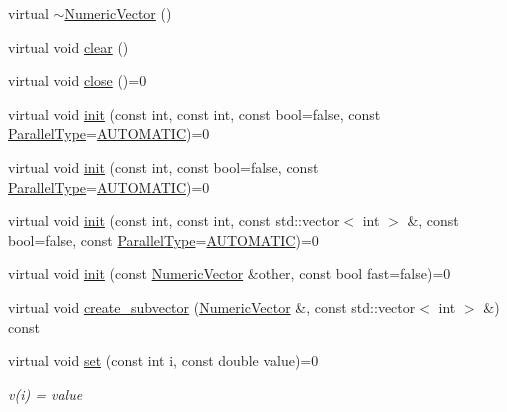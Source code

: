 \begin{DoxyCompactItemize}
\item 
virtual \mbox{\hyperlink{classfemus_1_1_numeric_vector_ae69f03cf2a4e651f87c9bccb4c454220}{$\sim$\+Numeric\+Vector}} ()
\item 
virtual void \mbox{\hyperlink{classfemus_1_1_numeric_vector_ab208467b03b999ece4888d64a7cc7ece}{clear}} ()
\item 
virtual void \mbox{\hyperlink{classfemus_1_1_numeric_vector_a80eb1dc1f53018fd7d08bcc4a511cc09}{close}} ()=0
\item 
virtual void \mbox{\hyperlink{classfemus_1_1_numeric_vector_abd17257b0b8aa9e09fd13cbd9c0bed08}{init}} (const int, const int, const bool=false, const \mbox{\hyperlink{_paralleltype_enum_8hpp_a55f694af2ca20b6481914237cf7e567c}{Parallel\+Type}}=\mbox{\hyperlink{_paralleltype_enum_8hpp_a55f694af2ca20b6481914237cf7e567ca0a831c2bc18e8354fe3e30ec0f3cdcda}{A\+U\+T\+O\+M\+A\+T\+IC}})=0
\item 
virtual void \mbox{\hyperlink{classfemus_1_1_numeric_vector_a25073e01fdd83a8eddf1e6c13ebc668c}{init}} (const int, const bool=false, const \mbox{\hyperlink{_paralleltype_enum_8hpp_a55f694af2ca20b6481914237cf7e567c}{Parallel\+Type}}=\mbox{\hyperlink{_paralleltype_enum_8hpp_a55f694af2ca20b6481914237cf7e567ca0a831c2bc18e8354fe3e30ec0f3cdcda}{A\+U\+T\+O\+M\+A\+T\+IC}})=0
\item 
virtual void \mbox{\hyperlink{classfemus_1_1_numeric_vector_af615f6d94b46ac802b4c2434177154ac}{init}} (const int, const int, const std\+::vector$<$ int $>$ \&, const bool=false, const \mbox{\hyperlink{_paralleltype_enum_8hpp_a55f694af2ca20b6481914237cf7e567c}{Parallel\+Type}}=\mbox{\hyperlink{_paralleltype_enum_8hpp_a55f694af2ca20b6481914237cf7e567ca0a831c2bc18e8354fe3e30ec0f3cdcda}{A\+U\+T\+O\+M\+A\+T\+IC}})=0
\item 
virtual void \mbox{\hyperlink{classfemus_1_1_numeric_vector_a5e855a5b6050845459cd81c721e088dd}{init}} (const \mbox{\hyperlink{classfemus_1_1_numeric_vector}{Numeric\+Vector}} \&other, const bool fast=false)=0
\item 
virtual void \mbox{\hyperlink{classfemus_1_1_numeric_vector_aabe0286e4e88ef9c2c8a8ea5442ea511}{create\+\_\+subvector}} (\mbox{\hyperlink{classfemus_1_1_numeric_vector}{Numeric\+Vector}} \&, const std\+::vector$<$ int $>$ \&) const
\item 
virtual void \mbox{\hyperlink{classfemus_1_1_numeric_vector_ae76dc72630fe1516241d7f02438e6c19}{set}} (const int i, const double value)=0
\begin{DoxyCompactList}\small\item\em v(i) = value \end{DoxyCompactList}\item 

\end{DoxyCompactItemize}
